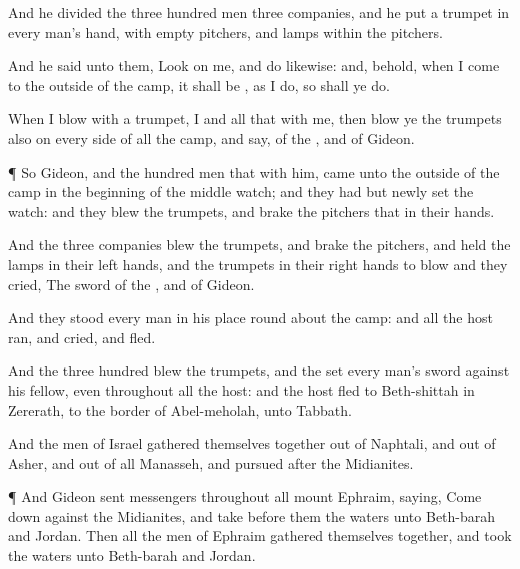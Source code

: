 {\par }{\PP {}And he
divided the
three
hundred
men
{}
three
companies, and he
put a
trumpet in every
man’s hand, with
empty
pitchers, and
lamps
within the
pitchers.

And he
said unto them,
Look on me, and
do likewise: and, behold, when I
come to the
outside of the
camp, it shall be
{}, as I
do, so shall ye
do.

When I
blow with a
trumpet, I and all that
{} with me, then
blow ye the
trumpets also on every
side of all the
camp, and
say,
{} of the
{}, and of
Gideon.


\par }{\PP {}¶ So
Gideon, and the
hundred
men that
{} with him,
came unto the
outside of the
camp in the
beginning of the
middle
watch; and they had
but
newly
set the
watch: and they
blew the
trumpets, and
brake the
pitchers that
{} in their
hands.

And the
three
companies
blew the
trumpets, and
brake the
pitchers, and
held the
lamps in their
left
hands, and the
trumpets in their
right
hands to
blow
{} and they
cried, The
sword of the
{}, and of
Gideon.

And they
stood every
man in his place round
about the
camp: and all the
host
ran, and
cried, and
fled.

And the
three
hundred
blew the
trumpets, and the
{}
set every
man’s
sword against his
fellow, even throughout all the
host: and the
host
fled to
Beth-shittah in
Zererath,
{} to the
border of
Abel-meholah, unto
Tabbath.


\par }{\PP {}And the
men of
Israel gathered themselves
together out of
Naphtali, and out of
Asher, and out of all
Manasseh, and
pursued
after the
Midianites.


\par }{\PP {}¶ And
Gideon
sent
messengers throughout all
mount
Ephraim,
saying, Come
down
against the
Midianites, and
take before them the
waters unto
Beth-barah and
Jordan. Then all the
men of
Ephraim gathered themselves
together, and
took the
waters unto
Beth-barah and
Jordan.

}
